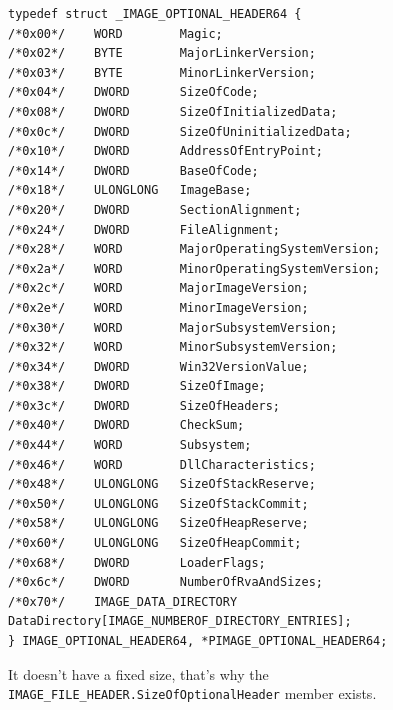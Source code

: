 \begin{verbatim}
typedef struct _IMAGE_OPTIONAL_HEADER64 {
/*0x00*/    WORD        Magic;
/*0x02*/    BYTE        MajorLinkerVersion;
/*0x03*/    BYTE        MinorLinkerVersion;
/*0x04*/    DWORD       SizeOfCode;
/*0x08*/    DWORD       SizeOfInitializedData;
/*0x0c*/    DWORD       SizeOfUninitializedData;
/*0x10*/    DWORD       AddressOfEntryPoint;
/*0x14*/    DWORD       BaseOfCode;
/*0x18*/    ULONGLONG   ImageBase;
/*0x20*/    DWORD       SectionAlignment;
/*0x24*/    DWORD       FileAlignment;
/*0x28*/    WORD        MajorOperatingSystemVersion;
/*0x2a*/    WORD        MinorOperatingSystemVersion;
/*0x2c*/    WORD        MajorImageVersion;
/*0x2e*/    WORD        MinorImageVersion;
/*0x30*/    WORD        MajorSubsystemVersion;
/*0x32*/    WORD        MinorSubsystemVersion;
/*0x34*/    DWORD       Win32VersionValue;
/*0x38*/    DWORD       SizeOfImage;
/*0x3c*/    DWORD       SizeOfHeaders;
/*0x40*/    DWORD       CheckSum;
/*0x44*/    WORD        Subsystem;
/*0x46*/    WORD        DllCharacteristics;
/*0x48*/    ULONGLONG   SizeOfStackReserve;
/*0x50*/    ULONGLONG   SizeOfStackCommit;
/*0x58*/    ULONGLONG   SizeOfHeapReserve;
/*0x60*/    ULONGLONG   SizeOfHeapCommit;
/*0x68*/    DWORD       LoaderFlags;
/*0x6c*/    DWORD       NumberOfRvaAndSizes;
/*0x70*/    IMAGE_DATA_DIRECTORY DataDirectory[IMAGE_NUMBEROF_DIRECTORY_ENTRIES];
} IMAGE_OPTIONAL_HEADER64, *PIMAGE_OPTIONAL_HEADER64;
\end{verbatim}


It doesn’t have a fixed size, that’s why the \verb+IMAGE_FILE_HEADER.SizeOfOptionalHeader+ member exists.

